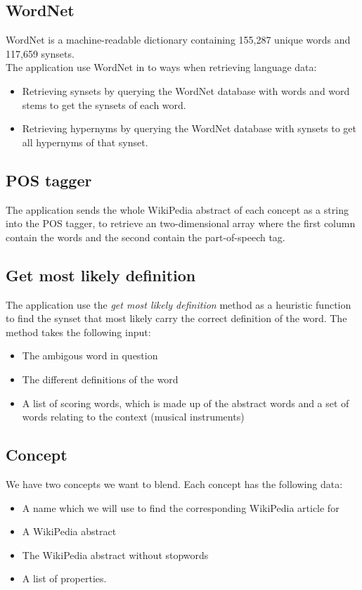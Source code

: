 \subsection{WordNet}
WordNet is a machine-readable dictionary containing 155,287 unique words and 117,659 synsets. \parencite{fellbaum1998wordnet} \parencite{wordnetstatistics}
\\The application use WordNet in to ways when retrieving language data:
\begin{itemize}
\item Retrieving synsets by querying the WordNet database with words and word stems to get the synsets of each word.
\item Retrieving hypernyms by querying the WordNet database with synsets to get all hypernyms of that synset.
\end{itemize}

\subsection{POS tagger}
The application sends the whole WikiPedia abstract of each concept as a string into the POS tagger, to retrieve an two-dimensional array where the first column contain the words and the second contain the part-of-speech tag.

\subsection{Get most likely definition}
The application use the \emph{get most likely definition} method as a heuristic function to find the synset that most likely carry the correct definition of the word. The method takes the following input:
\begin{itemize}
	\item The ambigous word in question
	\item The different definitions of the word
	\item A list of scoring words, which is made up of the abstract words and a set of words relating to the context (musical instruments)
\end{itemize}


\subsection{Concept}
We have two concepts we want to blend. Each concept has the following data:
\begin{itemize}
\item A name which we will use to find the corresponding WikiPedia article for
\item A WikiPedia abstract
\item The WikiPedia abstract without stopwords
\item A list of properties.
\end{itemize}

